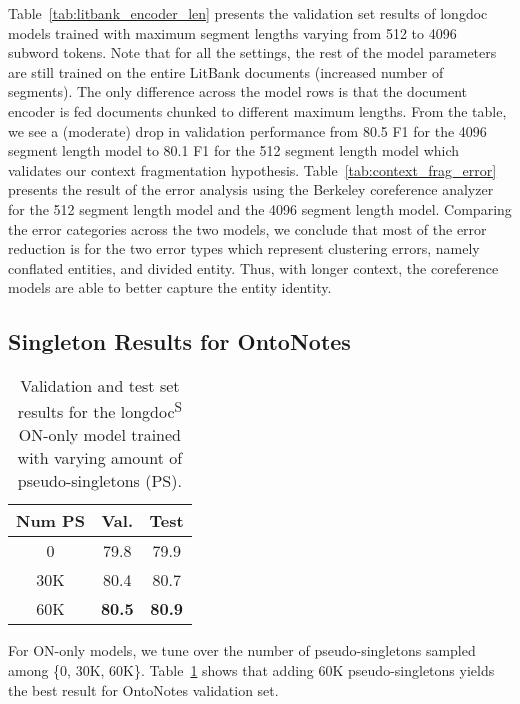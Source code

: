 \documentclass[12pt]{thesis-umich}[thesis]
\begin{document}
Table~\ref{tab:litbank_encoder_len} presents the validation set results of longdoc models trained with maximum segment lengths varying from 512 to 4096 subword tokens. 
Note that for all the settings, the rest of the model parameters are still trained on the entire LitBank documents (increased number of segments). 
The only difference across the model rows is that the document encoder is fed documents chunked to different maximum lengths. 
From the table, we see a (moderate) drop in validation performance from 80.5 F1 for the 4096 segment length model to 80.1 F1 for the 512 segment length model which validates our context fragmentation hypothesis. 
Table~\ref{tab:context_frag_error} presents the result of the error analysis using the Berkeley coreference analyzer~\cite{kummerfeld2013error} for the 512 segment length model and the 4096 segment length model. 
Comparing the error categories across the two models, we conclude that most of the error reduction is for the two error types which represent clustering errors, namely conflated entities, and divided entity. 
Thus, with longer context, the coreference models are able to better capture the entity identity. 




\subsection{Singleton Results for OntoNotes}
\label{sec:singleton_ontonotes}


\begin{table}[h]
    \centering
    \small
    \begin{tabular}{ccc}\toprule
    Num PS & Val. & Test \\
    \midrule
    \phantom{11}0 & 79.8 & 79.9 \\
    30K & 80.4  & 80.7 \\
    60K & \textbf{80.5} & \textbf{80.9} \\
    \bottomrule
    \end{tabular}
    \caption{Validation and test set results for the longdoc\textsuperscript{S} ON-only model trained with varying amount of pseudo-singletons (PS). }
    \label{tab:ontonotes_singletons}
\end{table} 
For ON-only models, we tune over the number of pseudo-singletons sampled among \{0, 30K, 60K\}. Table~\ref{tab:ontonotes_singletons} shows that adding 
60K pseudo-singletons yields the best result for OntoNotes validation set. 
\end{document}
